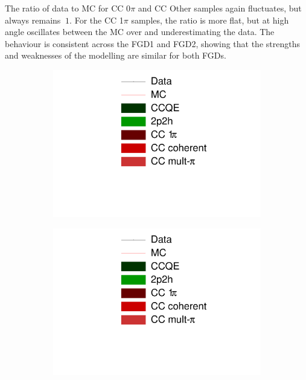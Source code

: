 The ratio of data to MC for CC 0$\pi$ and CC Other samples again fluctuates, but always remains $\>1$. For the CC 1$\pi$ samples, the ratio is more flat, but at high angle oscillates between the MC over and underestimating the data. The behaviour is consistent across the FGD1 and FGD2, showing that the strengths and weaknesses of the modelling are similar for both FGDs.

\begin{figure}[!htbp]
\centering
\begin{subfigure}{.24\textwidth}
  \centering
  \includegraphics[width=\linewidth, trim={5mm 60mm 30mm 0mm}, clip]{figs/legend}
\end{subfigure}
\begin{subfigure}{.24\textwidth}
  \centering
  \includegraphics[width=\linewidth, trim={5mm 0mm 30mm 80mm}, clip]{figs/legend}

\end{subfigure}
\end{figure}
